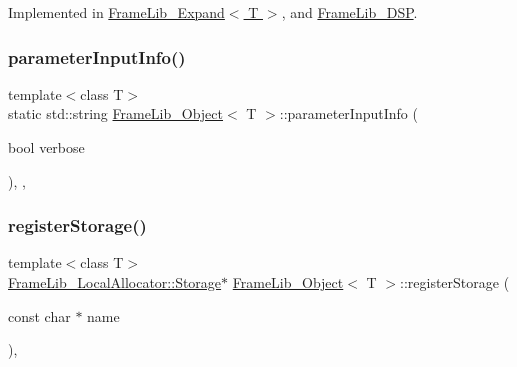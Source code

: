 Implemented in \hyperlink{class_frame_lib___expand_a235019747538c76a1505f60e0773c041}{Frame\+Lib\+\_\+\+Expand$<$ T $>$}, and \hyperlink{class_frame_lib___d_s_p_a14154f7fe15aa51b683e56e8a368b9ad}{Frame\+Lib\+\_\+\+D\+SP}.

\mbox{\label{class_frame_lib___object_a7c57bdfc3fa9a9bb34b607ffa240d47e}} 
\subsubsection{\texorpdfstring{parameter\+Input\+Info()}{parameterInputInfo()}}
{\footnotesize\ttfamily template$<$class T$>$ \\
static std\+::string \hyperlink{class_frame_lib___object}{Frame\+Lib\+\_\+\+Object}$<$ T $>$\+::parameter\+Input\+Info (\begin{DoxyParamCaption}\item[{bool}]{verbose }\end{DoxyParamCaption})\hspace{0.3cm}{\ttfamily [inline]}, {\ttfamily [static]}, {\ttfamily [protected]}}

\mbox{\label{class_frame_lib___object_a316d15b17757ddfef4341d0f8afe443e}} 
\subsubsection{\texorpdfstring{register\+Storage()}{registerStorage()}}
{\footnotesize\ttfamily template$<$class T$>$ \\
\hyperlink{class_frame_lib___local_allocator_1_1_storage}{Frame\+Lib\+\_\+\+Local\+Allocator\+::\+Storage}$\ast$ \hyperlink{class_frame_lib___object}{Frame\+Lib\+\_\+\+Object}$<$ T $>$\+::register\+Storage (\begin{DoxyParamCaption}\item[{const char $\ast$}]{name }\end{DoxyParamCaption})\hspace{0.3cm}{\ttfamily [inline]}, {\ttfamily [protected]}}

